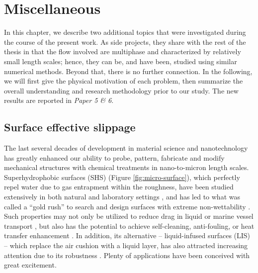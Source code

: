 \chapter{Miscellaneous}

In this chapter, we describe two additional topics that were investigated during the course of the present work.
As side projects, they share with the rest of the thesis in that the flow involved are multiphase and characterized by relatively small length scales; hence, they can be, and have been, studied using similar numerical methods.
Beyond that, there is no further connection.
In the following, we will first give the physical motivation of each problem, then summarize the overall understanding and research methodology prior to our study.
The new results are reported in \emph{Paper 5 \& 6}.


\section{Surface effective slippage}

The last several decades of development in material science and nanotechnology has greatly enhanced our ability to probe, pattern, fabricate and modify mechanical structures with chemical treatments in nano-to-micron length scales.
Superhydrophobic surfaces (SHS) (Figure \ref{fig:micro-surface}), which perfectly repel water due to gas entrapment within the roughness, have been studied extensively in both natural and laboratory settings \citep{plant_superhydro_1997, Onda_etal_1996}, and has led to what was called a ``gold rush'' to search and design surfaces with extreme non-wettability \citep{Bocquet}.
Such properties may not only be utilized to reduce drag in liquid or marine vessel transport \citep{Watanabe, Ou, Choi_Kim, Lee}, but also has the potential to achieve self-cleaning, anti-fouling, or heat transfer enhancement \citep{Blossey2003, Roach_etal_2008}.
In addition, its alternative -- liquid-infused surfaces (LIS) -- which replace the air cushion with a liquid layer, has also attracted increasing attention due to its robustness \citep{Solomon, Rosenberg, Wexler}.
Plenty of applications have been conceived with great excitement.

